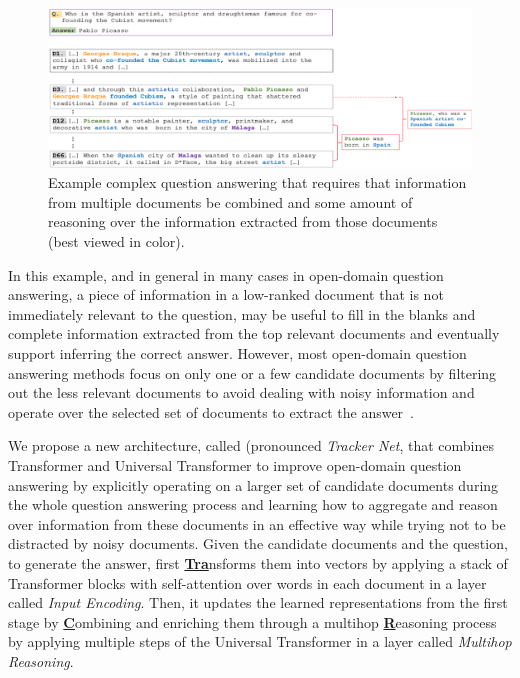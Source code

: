 \begin{figure}[!t]
 \centering
 \includegraphics[width=\textwidth]{04-part-03/chapter-06/figs_and_tables/fig_od_example.png}
 \caption{Example complex question answering that requires that information from multiple documents be combined and some amount of reasoning over the information extracted from those documents (best viewed in color).}
 \label{fig:example}
\end{figure}

In this example, and in general in many cases in open-domain question answering, a piece of information in a low-ranked document that is not immediately relevant to the question, may be useful to fill in the blanks and complete information extracted from the top relevant documents and eventually support inferring the correct answer.
However, most open-domain question answering methods focus on only one or a few candidate documents by filtering out the less relevant documents to avoid dealing with noisy information and operate over the selected set of documents to extract the answer~\citep{wang2017r, wang2017evidence,lin2018denoising}. 

We propose a new architecture, called \tracrnet (pronounced \emph{Tracker Net}, that combines Transformer and  Universal Transformer to improve open-domain question answering by explicitly operating on a larger set of candidate documents during the whole question answering process and learning how to aggregate and reason over information from these documents in an effective way while trying not to be distracted by noisy documents. 
% 
Given the candidate documents and the question, to generate the answer, \tracrnet first \underline{\textbf{Tra}}nsforms them into vectors by applying a stack of  Transformer blocks with self-attention over words in each document in a layer called \emph{Input Encoding}. 
Then, it updates the learned representations from the first stage by \underline{\textbf{C}}ombining and enriching them through a multihop \underline{\textbf{R}}easoning process by applying multiple steps of the Universal Transformer in a layer called \emph{Multihop Reasoning}.  

